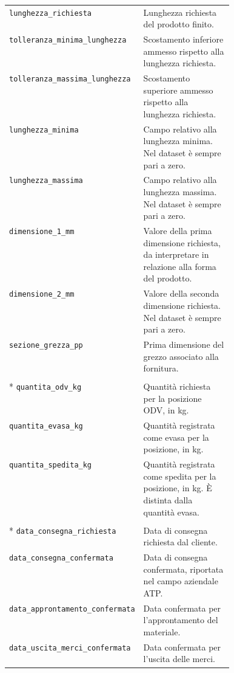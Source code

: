 \begin{longtable}{@{}p{0.43\linewidth}p{}@{}}
\texttt{lunghezza\_richiesta} & Lunghezza richiesta del prodotto finito. \\
\texttt{tolleranza\_minima\_lunghezza} & Scostamento inferiore ammesso rispetto alla lunghezza richiesta. \\
\texttt{tolleranza\_massima\_lunghezza} & Scostamento superiore ammesso rispetto alla lunghezza richiesta. \\
\texttt{lunghezza\_minima} & Campo relativo alla lunghezza minima. Nel dataset è sempre pari a zero. \\
\texttt{lunghezza\_massima} & Campo relativo alla lunghezza massima. Nel dataset è sempre pari a zero. \\
\texttt{dimensione\_1\_mm} & Valore della prima dimensione richiesta, da interpretare in relazione alla forma del prodotto. \\
\texttt{dimensione\_2\_mm} & Valore della seconda dimensione richiesta. Nel dataset è sempre pari a zero. \\
\texttt{sezione\_grezza\_pp} & Prima dimensione del grezzo associato alla fornitura. \\
\addlinespace[5pt]
\multicolumn{2}{@{}l}{\small\bfseries\color{ReportBlue} Quantità}\\*
\addlinespace[2pt]
\texttt{quantita\_odv\_kg} & Quantità richiesta per la posizione ODV, in kg. \\
\texttt{quantita\_evasa\_kg} & Quantità registrata come evasa per la posizione, in kg. \\
\texttt{quantita\_spedita\_kg} & Quantità registrata come spedita per la posizione, in kg. È distinta dalla quantità evasa. \\
\addlinespace[5pt]
\multicolumn{2}{@{}l}{\small\bfseries\color{ReportBlue} Date}\\*
\addlinespace[2pt]
\texttt{data\_consegna\_richiesta} & Data di consegna richiesta dal cliente. \\
\texttt{data\_consegna\_confermata} & Data di consegna confermata, riportata nel campo aziendale ATP. \\
\texttt{data\_approntamento\_confermata} & Data confermata per l'approntamento del materiale. \\
\texttt{data\_uscita\_merci\_confermata} & Data confermata per l'uscita delle merci. \\
\end{longtable}
\endgroup

